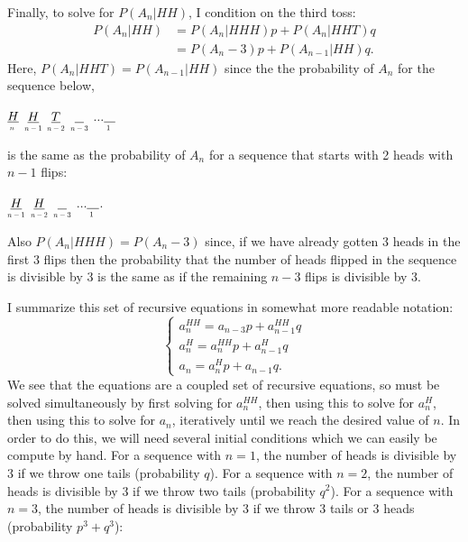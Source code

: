 \begin{problem}{4}
Finally, to solve for $P(A_n|HH)$, I condition on the third toss: 
\begin{align*}
P(A_n|HH) &= P(A_n|HHH)p+P(A_n|HHT)q \\
& = P(A_n-3)p+P(A_{n-1}|HH)q.
\end{align*}
Here, $P(A_n|HHT)=P(A_{n-1}|HH)$ since the the probability of $A_n$ for the sequence below, 
\begin{center}
$\underset{\scalebox{0.6}{$n$}}{\underline{H}}$ $\underset{\scalebox{0.6}{$n-1$}}{\underline{H}}$ $\underset{\scalebox{0.6}{$n-2$}}{\underline{T}}$ $\underset{\scalebox{0.6}{$n-3$}}{\underline{\phantom T}}$   $\ldots$$\underset{\scalebox{0.6}{$1$}}{\underline{\phantom H}}$
\end{center}
is the same as the probability of $A_n$ for a sequence that starts with 2 heads with $n-1$ flips:
\begin{center}
$\underset{\scalebox{0.6}{$n-1$}}{\underline{H}}$ $\underset{\scalebox{0.6}{$n-2$}}{\underline{H}}$ $\underset{\scalebox{0.6}{$n-3$}}{\underline{\phantom T}}$   $\ldots$$\underset{\scalebox{0.6}{$1$}}{\underline{\phantom H}}$.
\end{center}
Also $P(A_n|HHH) = P(A_n-3)$ since, if we have already gotten 3 heads in the first 3 flips then the probability that the number of heads flipped in the sequence is divisible by 3 is the same as if the remaining $n-3$ flips is divisible by 3. 

I summarize this set of recursive equations in somewhat more readable notation:
 \[
\left\{
                \begin{array}{ll}
                 a_n^{HH} = a_{n-3} p +a_{n-1}^{HH}q\\[10pt]
                  a_n^H = a_n^{HH} p +a_{n-1}^Hq\\[10pt]
                   a_n = a_n^H p +a_{n-1}q.
                 
                \end{array}
              \right.
  \]
We see that the equations are a coupled set of recursive equations, so must be solved simultaneously by first solving for $a_n^{HH}$, then using this to solve for $a_n^H $, then using this to solve for $a_n$, iteratively until we reach the desired value of $n$.  In order to do this, we will need several initial conditions which we can easily be compute by hand.  For a sequence with $n=1$, the number of heads is divisible by 3 if we throw one tails (probability $q$).   For a sequence with $n=2$, the number of heads is divisible by 3 if we throw two tails (probability $q^2$).  For a sequence with $n=3$, the number of heads is divisible by 3 if we throw 3 tails or 3 heads (probability $p^3+q^3$):


\end{problem}
